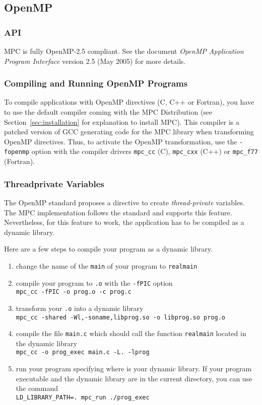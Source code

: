 \documentclass[a4paper,11pt]{article}
\begin{document}
\subsection{OpenMP}

\subsubsection{API}
MPC is fully OpenMP-2.5 compliant.
See the document \emph{OpenMP Application Program Interface} version 2.5
(May 2005) for more details.

\subsubsection{Compiling and Running OpenMP Programs}
To compile applications with OpenMP directives (C, C++ or Fortran), you have to
use the default compiler coming with the MPC Distribution (see
    Section~\ref{sec:installation} for explanation to install MPC).
This compiler is a patched version of GCC generating code for the MPC library
when transforming OpenMP directives.
Thus, to activate the OpenMP transformation, use the \texttt{-fopenmp} option
with the compiler drivers \texttt{mpc\_cc} (C), \texttt{mpc\_cxx} (C++) or \texttt{mpc\_f77} (Fortran).

\subsubsection{Threadprivate Variables}

The OpenMP standard proposes a directive to create \emph{thread-private} variables.
The MPC implementation follows the standard and supports this feature.
Nevertheless, for this feature to work, the application has to be compiled as a dynamic library.

Here are a few steps to compile your program as a dynamic library.
\begin{enumerate}
\item change the name of the \texttt{main} of your program to \texttt{realmain}
\item compile your program to \texttt{.o} with the \texttt{-fPIC} option\\
\verb!mpc_cc -fPIC -o prog.o -c prog.c!
\item transform your \texttt{.o} into a dynamic library\\
\verb!mpc_cc -shared -Wl,-soname,libprog.so -o libprog.so prog.o!
\item compile the file \texttt{main.c} which should call the function \texttt{realmain} located
in the dynamic library\\
\verb!mpc_cc -o prog_exec main.c -L. -lprog!
\item run your program specifying where is your dynamic library. If your program
executable and the dynamic library are in the current directory, you can use the command\\
\verb!LD_LIBRARY_PATH=. mpc_run ./prog_exec!
\end{enumerate}
\end{document}
